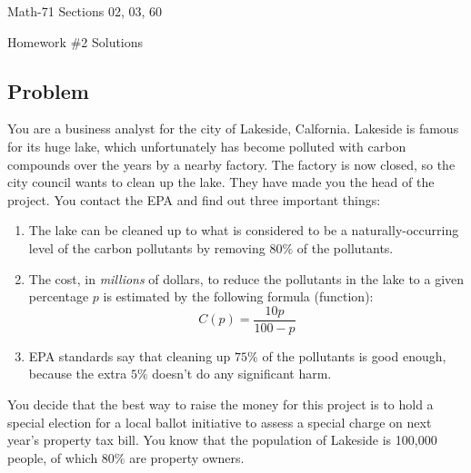 \documentclass[letterpaper,12pt,fleqn]{article}
\begin{document}
\begin{center}
  \large
  Math-71 Sections 02, 03, 60

  \Large
  Homework \#2 Solutions
\end{center}

\subsection*{Problem}

You are a business analyst for the city of Lakeside, Calfornia.  Lakeside is famous for its huge lake, which
unfortunately has become polluted with carbon compounds over the years by a nearby factory.  The factory is now
closed, so the city council wants to clean up the lake.  They have made you the head of the project.  You contact
the EPA and find out three important things:
\begin{enumerate}
\item The lake can be cleaned up to what is considered to be a naturally-occurring level of the carbon pollutants
  by removing \(80\%\) of the pollutants.
\item The cost, in \emph{millions} of dollars, to reduce the pollutants in the lake to a given percentage \(p\) is
  estimated by the following formula (function):
  \[C(p)=\frac{10p}{100-p}\]
\item EPA standards say that cleaning up \(75\%\) of the pollutants is good enough, because the extra \(5\%\)
  doesn't do any significant harm.
\end{enumerate}
You decide that the best way to raise the money for this project is to hold a special election for a local ballot
initiative to assess a special charge on next year's property tax bill.  You know that the population of Lakeside
is 100,000 people, of which \(80\%\) are property owners.
\end{document}
